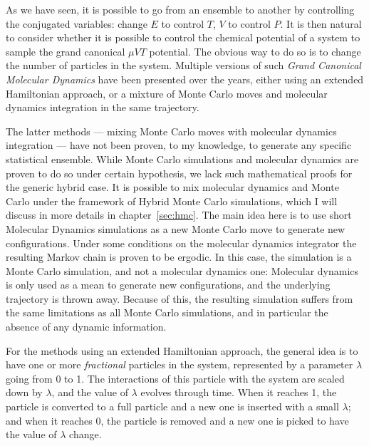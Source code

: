 \documentclass[thesis]{subfiles}
\begin{document}
As we have seen, it is possible to go from an ensemble to another by
controlling the conjugated variables: change $E$ to control $T$, $V$ to control
$P$. It is then natural to consider whether it is possible to control the
chemical potential of a system to sample the grand canonical $\mu V T$
potential. The obvious way to do so is to change the number of particles in the
system. Multiple versions of such \emph{Grand Canonical Molecular Dynamics} have
been presented over the years, either using an extended Hamiltonian
approach\cite{Cagin1991,Lo1995,Eslami2007}, or a mixture of Monte Carlo moves
and molecular dynamics integration in the same
trajectory\cite{Heffelfinger1994,Cracknell1995,Boinepalli2003}.

The latter methods --- mixing Monte Carlo moves with molecular dynamics
integration --- have not been proven, to my knowledge, to generate any specific
statistical ensemble. While Monte Carlo simulations and molecular dynamics are
proven to do so under certain hypothesis, we lack such mathematical proofs for
the generic hybrid case. It is possible to mix molecular dynamics and Monte
Carlo under the framework of Hybrid Monte Carlo simulations, which I will
discuss in more details in chapter~\ref{sec:hmc}. The main idea here is to use
short Molecular Dynamics simulations as a new Monte Carlo move to generate new
configurations. Under some conditions on the molecular dynamics integrator the
resulting Markov chain is proven to be ergodic. In this case, the simulation is
a Monte Carlo simulation, and not a molecular dynamics one: Molecular dynamics
is only used as a mean to generate new configurations, and the underlying
trajectory is thrown away. Because of this, the resulting simulation suffers
from the same limitations as all Monte Carlo simulations, and in particular the
absence of any dynamic information.

For the methods using an extended Hamiltonian approach, the general idea is to
have one or more \emph{fractional} particles in the system, represented by a
parameter $\lambda$ going from 0 to 1.  The interactions of this particle with
the system are scaled down by $\lambda$, and the value of $\lambda$ evolves
through time. When it reaches 1, the particle is converted to a full particle
and a new one is inserted with a small $\lambda$; and when it reaches 0, the
particle is removed and a new one is picked to have the value of $\lambda$
change.
\end{document}
